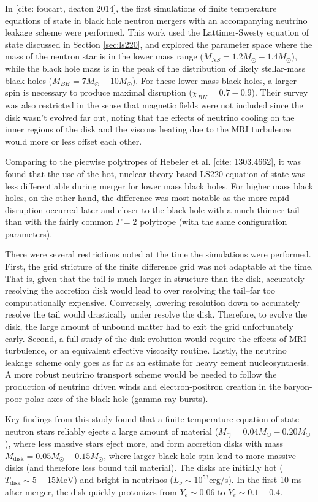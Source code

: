 In [cite: foucart, deaton 2014], the first simulations of finite temperature equations of state in black hole neutron mergers with an accompanying neutrino leakage scheme were performed.  This work used the Lattimer-Swesty equation of state discussed in Section \ref{sec:ls220}, and explored the parameter space where the mass of the neutron star is in the lower mass range ($M_{NS} = 1.2 M_\odot - 1.4 M_\odot$), while the black hole mass is in the peak of the distribution of likely stellar-mass black holes ($M_{BH} = 7 M_\odot - 10 M_\odot$).  For these lower-mass black holes, a larger spin is necessary to produce maximal disruption ($\chi_{BH} = 0.7 - 0.9$).  Their survey was also restricted in the sense that magnetic fields were not included since the disk wasn't evolved far out, noting that the effects of neutrino cooling on the inner regions of the disk and the viscous heating due to the MRI turbulence would more or less offset each other.

Comparing to the piecwise polytropes of Hebeler et al. [cite: 1303.4662], it was found that the use of the hot, nuclear theory based LS220 equation of state was less differentiable during merger for lower mass black holes.  For higher mass black holes, on the other hand, the difference was most notable as the more rapid disruption occurred later and closer to the black hole with a much thinner tail than with the fairly common $\Gamma = 2$ polytrope (with the same configuration parameters).

There were several restrictions noted at the time the simulations were performed.  First, the grid stricture of the finite difference grid was not adaptable at the time.  That is, given that the tail is much larger in structure than the disk, accurately resolving the accretion disk would lead to over resolving the tail--far too computationally expensive.  Conversely, lowering resolution down to accurately resolve the tail would drastically under resolve the disk.  Therefore, to evolve the disk, the large amount of unbound matter had to exit the grid unfortunately early.  Second, a full study of the disk evolution would require the effects of MRI turbulence, or an equivalent effective viscosity routine.   Lastly, the neutrino leakage scheme only goes as far as an estimate for heavy eement nucleosynthesis.  A more robust neutrino transport scheme would be needed to follow the production of neutrino driven winds and electron-positron creation in the baryon-poor polar axes of the black hole (gamma ray bursts).

Key findings from this study found that a finite temperature equation of state neutron stars reliably ejects a large amount of material ($M_\textrm{ej} = 0.04 M_\odot -  0.20 M_\odot$), where less massive stars eject more, and form accretion disks with mass $M_\textrm{disk} = 0.05 M_\odot -  0.15 M_\odot$, where larger black hole spin lend to more massive disks (and therefore less bound tail material).  The disks are initially hot ($T_\textrm{disk} \sim 5-15 \textrm{MeV}$) and bright in neutrinos ($L_\nu \sim 10^{53} \textrm{erg/s}$).  In the first 10 ms after merger, the disk quickly protonizes from $Y_e \sim 0.06$ to $Y_e \sim 0.1 - 0.4$. 



